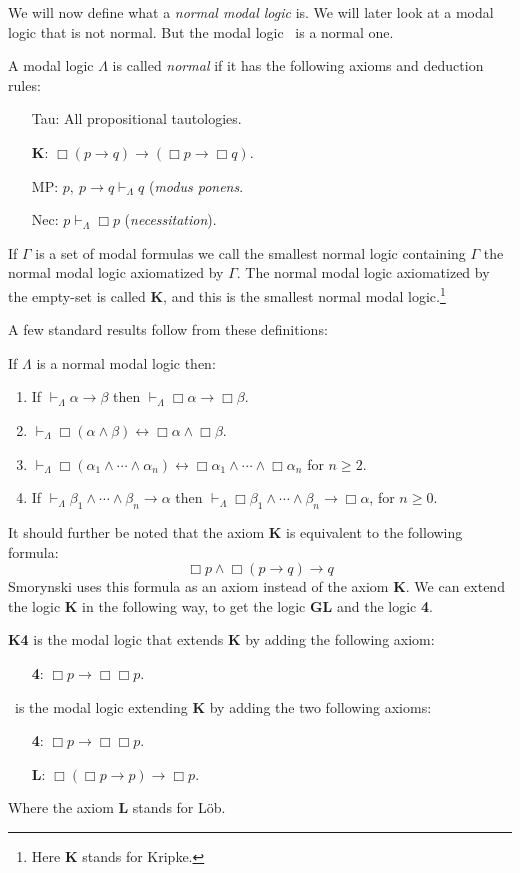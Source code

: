 \documentclass[../main.tex]{subfiles}
\begin{document}
We will now define what a \textit{normal modal logic} is. We will later look at
a modal logic that is not normal. But the modal logic \GL\ is a normal one.
\begin{defi}
	A modal logic $\Lambda$ is called \textit{normal} if it has the following
	axioms and deduction rules:
	\begin{enumerate}
		\item[Tau:] All propositional tautologies. 
		\item[\textbf{K}:] $\Box(p\rightarrow q)\rightarrow(\Box p\rightarrow\Box
			q)$.
		\item[MP:] $p,\ p\rightarrow q \vdash_\Lambda q$
			(\textit{modus ponens}.
		\item[Nec:] $p \vdash_\Lambda\Box p$ (\textit{necessitation}).
	\end{enumerate}
	If $\Gamma$ is a set of modal formulas we call the smallest normal
	logic containing $\Gamma$ the normal modal logic axiomatized by
	$\Gamma$. The normal modal logic axiomatized by the empty-set is called
	\textbf{K}, and
	this is the smallest normal modal logic.\footnote{Here \textbf{K}
	stands for Kripke.}
\end{defi}
A few standard results follow from these definitions:
\begin{prop}
	If $\Lambda$ is a normal modal logic then:
	\begin{enumerate}
		\item If $\vdash_\Lambda\alpha\rightarrow\beta$ then
		$\vdash_\Lambda\Box\alpha\rightarrow\Box\beta$.
	\item
		$\vdash_\Lambda\Box(\alpha\wedge\beta)\leftrightarrow\Box\alpha\wedge\Box\beta$.
	\item
		$\vdash_\Lambda\Box(\alpha_1\wedge\cdots\wedge\alpha_n)\leftrightarrow
		\Box\alpha_1\wedge\cdots\wedge\Box\alpha_n$ for $n\geq 2$.
	\item If
		$\vdash_\Lambda\beta_1\wedge\cdots\wedge\beta_n\rightarrow\alpha$
		then
		$\vdash_\Lambda\Box\beta_1\wedge\cdots\wedge\beta_n\rightarrow\Box\alpha$,
		for $n\geq 0$.
	\end{enumerate}
\end{prop}
It should further be noted that the axiom \textbf{K} is equivalent to the
following formula:
\[\Box p\wedge\Box(p\rightarrow q)\rightarrow q\]
Smorynski uses this formula as an axiom instead of the axiom \textbf{K}.
We can extend the logic \textbf{K} in the following way, to get the logic
\textbf{GL} and the logic \textbf{4}.
\begin{defi}
	\textbf{K4} is the modal logic that extends \textbf{K} by adding the
	following axiom:
	\begin{enumerate}
		\item[\textbf{4}:] $\Box p \rightarrow\Box\Box p$.
	\end{enumerate}
	\GL\ is the modal logic extending \textbf{K} by adding the two following
	axioms:
	\begin{enumerate}
		\item[\textbf{4}:] $\Box p\rightarrow\Box\Box p$.
		\item[\textbf{L}:]
			$\Box(\Box p\rightarrow p)\rightarrow\Box p$.
	\end{enumerate}
	Where the axiom \textbf{L} stands for Löb.
\end{defi}
\end{document}
